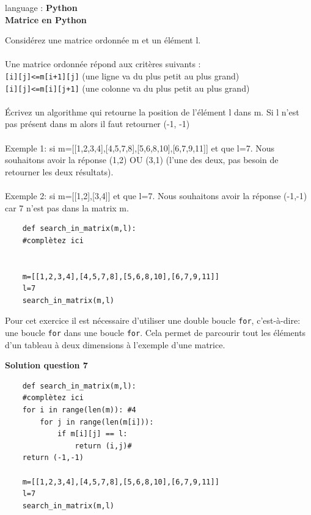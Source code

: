 \begin{Exercice}[10 minutes] language : \textbf{Python}\\
    
    \textbf{Matrice en Python}

    Considérez une matrice ordonnée m et un élément l.\\\\
    
    Une matrice ordonnée répond aux critères suivants :\\
     \lstinline{[i][j]<=m[i+1][j]} (une ligne va du plus petit au plus grand)\\
     \lstinline{[i][j]<=m[i][j+1]} (une colonne va du plus petit au plus grand)\\\\
 
    
    Écrivez un algorithme qui retourne la position de l’élément l dans m. Si l n’est pas présent dans m alors il faut retourner (-1, -1)\\\\
    
    Exemple 1: si m=[[1,2,3,4],[4,5,7,8],[5,6,8,10],[6,7,9,11]] et que l=7. Nous souhaitons avoir la réponse (1,2) OU (3,1) (l’une des deux, pas besoin de retourner les deux résultats).\\\\
    
    Exemple 2: si m=[[1,2],[3,4]] et que l=7. Nous souhaitons avoir la réponse (-1,-1) car 7 n’est pas dans la matrix m.\\


    \begin{verbatim}
    def search_in_matrix(m,l):
    #complètez ici
    
    
    m=[[1,2,3,4],[4,5,7,8],[5,6,8,10],[6,7,9,11]]
    l=7
    search_in_matrix(m,l)
    \end{verbatim}

    \begin{conseil}
    Pour cet exercice il est nécessaire d'utiliser une double boucle \lstinline{for}, c'est-à-dire: une boucle \lstinline{for} dans une boucle \lstinline{for}. Cela permet de parcourir tout les éléments d'un tableau à deux dimensions à l'exemple d'une matrice. 
    \end{conseil}

\textbf{Solution question 7}

    \begin{verbatim}
    def search_in_matrix(m,l):
    #complètez ici
    for i in range(len(m)): #4
        for j in range(len(m[i])):
            if m[i][j] == l:
                return (i,j)#
    return (-1,-1)
    
    m=[[1,2,3,4],[4,5,7,8],[5,6,8,10],[6,7,9,11]]
    l=7
    search_in_matrix(m,l)
    \end{verbatim}

\end{Exercice}

